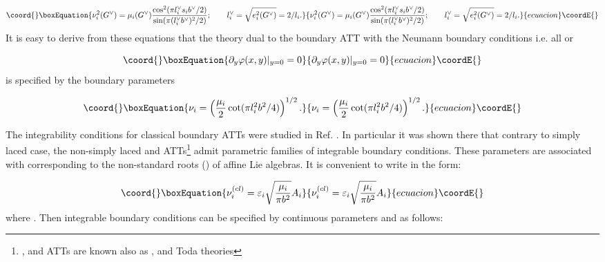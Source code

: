 \documentclass[a4paper,12pt,titlepage,final]{article}
\begin{document}
\begin{equation}\coord{}\boxEquation{
\nu _{i}^{2}(G^{\vee })=\mu _{i}(G^{\vee })\frac{\cos ^{2}(\pi
l_{i}^{\vee } s_{i}b^{\vee }/2)}{\sin (\pi (l_{i}^{\vee }b^{\vee
})^{2}/2)};\qquad l_{i}^{\vee }=\sqrt{e_{i}^{2}(G^{\vee })}=2/l_{i}.
\label{nBD}
}{
\nu _{i}^{2}(G^{\vee })=\mu _{i}(G^{\vee })\frac{\cos ^{2}(\pi
l_{i}^{\vee } s_{i}b^{\vee }/2)}{\sin (\pi (l_{i}^{\vee }b^{\vee
})^{2}/2)};\qquad l_{i}^{\vee }=\sqrt{e_{i}^{2}(G^{\vee })}=2/l_{i}.
}{ecuacion}\coordE{}\end{equation}
It is easy to derive from these equations that the theory dual to the 
boundary
ATT with the Neumann boundary conditions i.e. all \coordHE{} or

\begin{equation}\coord{}\boxEquation{
\partial _{y}\varphi (x,y)|_{y=0}=0  \label{N}
}{
\partial _{y}\varphi (x,y)|_{y=0}=0  }{ecuacion}\coordE{}\end{equation}
is specified by the boundary parameters

\begin{equation}\coord{}\boxEquation{
\nu _{i}=\left( \frac{\mu _{i}}{2}\cot (\pi l_{i}^{2}b^{2}/4)\right) ^{1/2}.
\label{ND}
}{
\nu _{i}=\left( \frac{\mu _{i}}{2}\cot (\pi l_{i}^{2}b^{2}/4)\right) ^{1/2}.
}{ecuacion}\coordE{}\end{equation}

The integrability conditions for classical boundary ATTs were studied in
Ref. \cite{BCD}. In particular it was shown there that contrary to simply
laced case, the non-simply laced \coordHE{}
and \coordHE{} ATTs\footnote{\coordHE{}, \coordHE{} and \coordHE{}
ATTs
are known also as \coordHE{}, \coordHE{}
and \coordHE{} Toda theories}
admit  parametric families of integrable boundary
conditions. These parameters are associated with \coordHE{} corresponding to
the non-standard roots (\coordHE{}) of affine Lie algebras. It is
convenient to write \coordHE{} in the form:

\begin{equation}\coord{}\boxEquation{
\nu _{i}^{(cl)}=\varepsilon _{i}\sqrt{\frac{\mu _{i}}{\pi b^{2}}}A_{i}
\label{sig}
}{
\nu _{i}^{(cl)}=\varepsilon _{i}\sqrt{\frac{\mu _{i}}{\pi b^{2}}}A_{i}
}{ecuacion}\coordE{}\end{equation}
where \coordHE{}. Then integrable boundary conditions can be
specified by continuous parameters \coordHE{} and \coordHE{} as follows:
\end{document}
